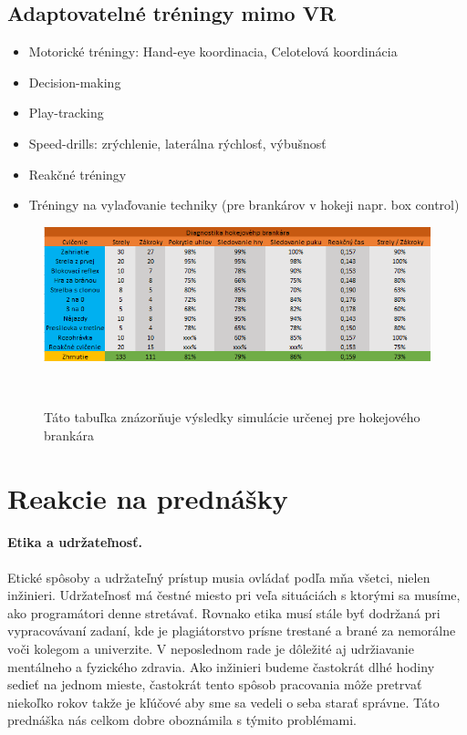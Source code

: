 \documentclass[10pt,twoside,slovak,a4paper]{article}										%
\begin{document}
\subsection{Adaptovatelné tréningy mimo VR} 
\begin{itemize}
\item Motorické tréningy: Hand-eye koordinacia, Celotelová koordinácia	
\item Decision-making
\item Play-tracking
\item Speed-drills: zrýchlenie, laterálna rýchlosť, výbušnosť
\item Reakčné tréningy
\item Tréningy na vylaďovanie techniky (pre brankárov v hokeji napr. box control)
\end{itemize}

\clearpage
\begin{figure}[h]
\centering
\includegraphics[scale=0.59]{tabulka.png}
\caption{Táto tabuľka znázorňuje výsledky simulácie určenej pre hokejového brankára}  ~\cite{Hlavny:zdroj}
\label{fig}
\end{figure}

\section{Reakcie na prednášky}

\paragraph{Etika a udržateľnosť. } 
Etické spôsoby a udržateľný prístup musia ovládať podľa mňa všetci, nielen inžinieri. Udržateľnosť má čestné miesto pri veľa situáciách s ktorými sa musíme, ako programátori denne stretávať. Rovnako etika musí stále byť dodržaná pri vypracovávaní zadaní, kde je plagiátorstvo prísne trestané a brané za nemorálne voči kolegom a univerzite. V neposlednom rade je dôležité aj udržiavanie mentálneho a fyzického zdravia. Ako inžinieri budeme častokrát dlhé hodiny sedieť na jednom mieste, častokrát tento spôsob pracovania môže pretrvať niekoľko rokov takže je kľúčové aby sme sa vedeli o seba starať správne. Táto prednáška nás celkom dobre oboznámila s týmito problémami.~\cite{etics:zdroj}
\end{document}
